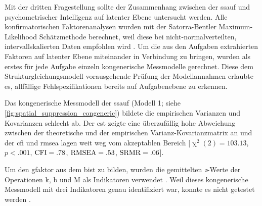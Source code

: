 \documentclass[11pt, twoside, a4paper]{book}		%
\begin{document}
Mit der dritten Fragestellung sollte der Zusammenhang zwischen der \gls{ssauf} und psychometrischer Intelligenz auf latenter Ebene untersucht werden. 
Alle konfirmatorischen Faktorenanalysen wurden mit der Satorra-Bentler Maximum-Likelihood Schätzmethode \citep{Satorra1994} berechnet, weil diese bei nicht-normal\-ver\-teilten, intervallskalierten Daten empfohlen wird \citep[z.B.][]{Curran1996, Finney2006}.
Um die aus den Aufgaben extrahierten Faktoren auf latenter Ebene miteinander in Verbindung zu bringen, wurden als erstes für jede Aufgabe einzeln kongenerische Messmodelle \citep{Joereskog1971} gerechnet. Diese dem Strukturgleichungsmodell vorausgehende Prüfung der Modellannahmen erlaubte es, allfällige Fehlspezifikationen bereits auf Aufgabenebene zu erkennen.

Das kongenerische Messmodell der \gls{ssauf} (Modell 1; siehe \autoref{fig:spatial_suppression_congeneric}) bildete die empirischen Varianzen und Kovarianzen schlecht ab.  Der \gls{cst} zeigte eine überzufällig hohe Abweichung zwischen der theoretische und der empirischen Var\-ianz-Ko\-var\-ianz\-ma\-trix an und der \gls{cfi} und \gls{rmsea} lagen weit weg vom akzeptablen Bereich [$\upchi^2(2)=103.13$, $p<.001$, $\textnormal{CFI}=.78$, $\textnormal{RMSEA}=.53$, $\textnormal{SRMR}=.06$].

Um den \gls{gfaktor} aus dem \gls{bist} zu bilden, wurden die gemittelten \textit{z}-Werte der Operationen \gls{k}, \gls{b} und \gls{M} als Indikatoren verwendet \citep[für ein gleiches Vorgehen siehe][]{Stauffer2014}. Weil dieses kongenerische Messmodell mit drei Indikatoren genau identifiziert war, konnte es nicht getestet werden \citep[][S. 125]{Kline2011}.
\end{document}
